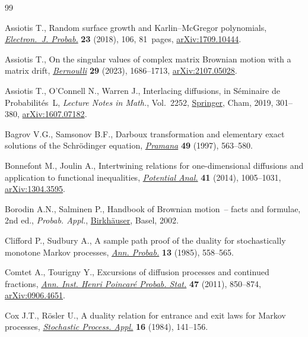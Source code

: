 \documentclass[10pt,a4paper]{amsart}
\numberwithin{equation}{section}
\theoremstyle{definition}
\begin{document}
\begin{thebibliography}{99}
\footnotesize\itemsep=0pt

Assiotis T., Random surface growth and {K}arlin--{M}c{G}regor polynomials,
 \href{https://doi.org/10.1214/18-ejp236}{\textit{Electron.~J. Probab.}}
 \textbf{23} (2018), 106, 81~pages,
 \href{http://arxiv.org/abs/1709.10444}{arXiv:1709.10444}.

Assiotis T., On the singular values of complex matrix {B}rownian motion with a
 matrix drift, \href{https://doi.org/10.3150/22-bej1517}{\textit{Bernoulli}}
 \textbf{29} (2023), 1686--1713,
 \href{http://arxiv.org/abs/2107.05028}{arXiv:2107.05028}.

Assiotis T., O'Connell N., Warren J., Interlacing diffusions, in S\'eminaire de
 {P}robabilit\'es~{L}, \textit{Lecture Notes in Math.}, Vol.~2252,
 \href{https://doi.org/10.1007/978-3-030-28535-7_13}{Springer}, Cham, 2019,
 301--380, \href{http://arxiv.org/abs/1607.07182}{arXiv:1607.07182}.

Bagrov V.G., Samsonov B.F., Darboux transformation and elementary exact
 solutions of the {S}chr\"odinger equation,
 \href{https://doi.org/10.1007/BF02848330}{\textit{Pramana}} \textbf{49}
 (1997), 563--580.

Bonnefont M., Joulin A., Intertwining relations for one-dimensional diffusions
 and application to functional inequalities,
 \href{https://doi.org/10.1007/s11118-014-9408-7}{\textit{Potential Anal.}}
 \textbf{41} (2014), 1005--1031,
 \href{http://arxiv.org/abs/1304.3595}{arXiv:1304.3595}.

Borodin A.N., Salminen P., Handbook of {B}rownian motion~-- facts and formulae,
 2nd ed., \textit{Probab. Appl.},
 \href{https://doi.org/10.1007/978-3-0348-8163-0}{Birkh\"auser}, Basel, 2002.

Clifford P., Sudbury A., A sample path proof of the duality for stochastically
 monotone {M}arkov processes,
 \href{https://doi.org/10.1214/aop/1176993008}{\textit{Ann. Probab.}}
 \textbf{13} (1985), 558--565.

Comtet A., Tourigny Y., Excursions of diffusion processes and continued
 fractions, \href{https://doi.org/10.1214/10-AIHP390}{\textit{Ann. Inst. Henri
 Poincar\'e Probab. Stat.}} \textbf{47} (2011), 850--874,
 \href{http://arxiv.org/abs/0906.4651}{arXiv:0906.4651}.

Cox J.T., R\"osler U., A duality relation for entrance and exit laws for
 {M}arkov processes,
 \href{https://doi.org/10.1016/0304-4149(84)90015-2}{\textit{Stochastic
 Process. Appl.}} \textbf{16} (1984), 141--156.


\end{thebibliography}
\end{document}
